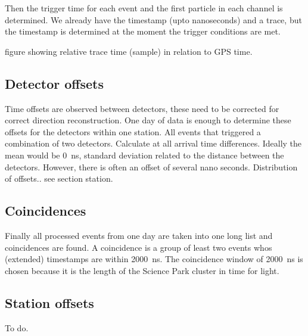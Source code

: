 Then the trigger time for each event and the first particle in each channel is determined. We already have the \gps timestamp (upto nanoseconds) and a trace, but the timestamp is determined at the moment the trigger conditions are met.

figure showing  relative trace time (sample)  in relation to GPS time.


\subsection{Detector offsets}

Time offsets are observed between detectors, these need to be corrected for correct direction reconstruction. One day of data is enough to determine these offsets for the detectors within one station. All events that triggered a combination of two detectors. Calculate at all arrival time differences. Ideally the mean would be \SI{0}{\ns}, standard deviation related to the distance between the detectors. However, there is often an offset of several nano seconds. Distribution of offsets.. see section station.


\subsection{Coincidences}

Finally all processed events from one day are taken into one long list and coincidences are found. A coincidence is a group of least two events whos (extended) timestamps are within \SI{2000}{\ns}. The coincidence window of \SI{2000}{\ns} is chosen because it is the length of the Science Park cluster in time for light.


\subsection{Station offsets}

To do.
